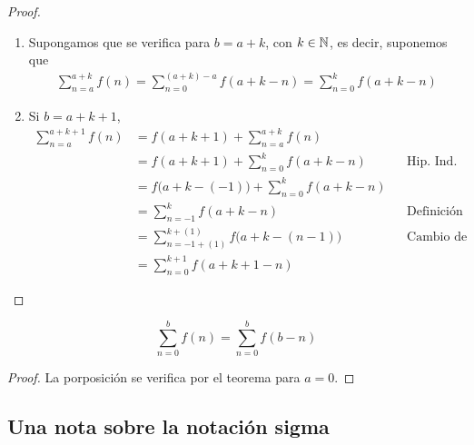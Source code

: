 \begin{enumerate}[label=\alph*)]
\begin{proof}
\begin{enumerate}[label=\Roman*)]
\begin{enumerate}[label=\roman*)]
      \item Supongamos que se verifica para $b=a+k$, con $k\in \mathbb{N}$, es decir, suponemos que
      \begin{align*}
        \sum_{n=a}^{a+k}f(n) = \sum_{n=0}^{(a+k)-a} f(a+k-n) = \sum_{n=0}^{k} f(a+k-n)
      \end{align*}

      \item Si $b=a+k+1$,
      \begin{align*}
        \sum_{n=a}^{a+k+1} f(n) &= f(a+k+1) + \sum_{n=a}^{a+k} f(n)\\
        &= f(a+k+1) + \sum_{n=0}^{k} f(a+k-n) && \text{Hip. Ind.}\\
        &= f\bigl(a+k-(-1)\bigr) + \sum_{n=0}^{k} f(a+k-n)\\
        &= \sum_{n=-1}^k f(a+k-n) && \text{Definición (de sumatoria)}\\
        &= \sum_{n=-1+(1)}^{k+(1)} f\bigl(a+k-(n-1)\bigr) && \text{Cambio de índice}\\
        &= \sum_{n=0}^{k+1} f(a+k+1-n)
      \end{align*}
      
    \end{enumerate}

    \end{enumerate}
  \end{proof}

   \[\sum_{n=0}^{b}f(n) = \sum_{n=0}^{b} f(b-n)\]

  \begin{proof}\leavevmode
    La porposición se verifica por el teorema para $a=0$.
  \end{proof}

    
  \end{enumerate}

\subsection*{Una nota sobre la notación sigma}




